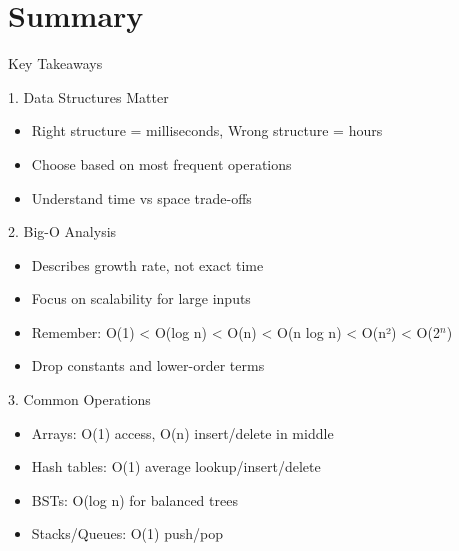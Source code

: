 \documentclass[aspectratio=169,xcolor=dvipsnames]{beamer}
\begin{document}
\section{Summary}

\begin{frame}{Key Takeaways}
  \begin{block}{1. Data Structures Matter}
    \begin{itemize}
      \item Right structure = milliseconds, Wrong structure = hours
      \item Choose based on most frequent operations
      \item Understand time vs space trade-offs
    \end{itemize}
  \end{block}

  \begin{block}{2. Big-O Analysis}
    \begin{itemize}
      \item Describes growth rate, not exact time
      \item Focus on scalability for large inputs
      \item Remember: O(1) < O(log n) < O(n) < O(n log n) < O(n²) < O(2$^n$)
      \item Drop constants and lower-order terms
    \end{itemize}
  \end{block}

  \begin{block}{3. Common Operations}
    \begin{itemize}
      \item Arrays: O(1) access, O(n) insert/delete in middle
      \item Hash tables: O(1) average lookup/insert/delete
      \item BSTs: O(log n) for balanced trees
      \item Stacks/Queues: O(1) push/pop
    \end{itemize}
  \end{block}
\end{frame}
\end{document}
